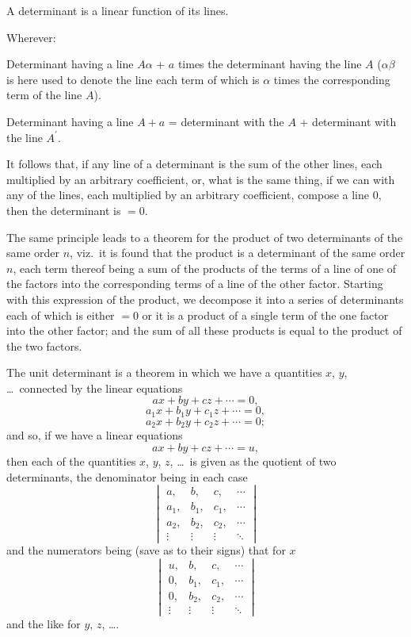 \documentclass[11pt,a4paper]{article}
\theoremstyle{plain}
\theoremstyle{definition}
\begin{document}
A determinant is a linear function of its lines.

Wherever:

Determinant having a line $A$\;$\alpha$ + $a$ times the determinant having the line $A$ ($\alpha\beta$
is here used to denote the line each term of which is $\alpha$ times the corresponding term
of the line $A$).

\clearpage

\noindent
Determinant having a line $A + a$ = determinant with the $A$ + determinant with the
line $A^\prime$.

It follows that, if any line of a determinant is the sum of the other lines, each
multiplied by an arbitrary coefficient, or, what is the same thing, if we can with any
of the lines, each multiplied by an arbitrary coefficient, compose a line $0$, then the
determinant is $= 0$.

The same principle leads to a theorem for the product of two determinants of the
same order $n$, viz.\ it is found that the product is a determinant of the same order $n$,
each term thereof being a sum of the products of the terms of a line of one of the
factors into the corresponding terms of a line of the other factor.  Starting with this
expression of the product, we decompose it into a series of determinants each of which
is either $= 0$ or it is a product of a single term of the one factor into the other
factor; and the sum of all these products is equal to the product of the two factors.

The unit determinant is a theorem in which we have a quantities $x$, $y$, \dots\ connected by the linear equations
\[
ax + by + cz + \cdots = 0,
\]
\[
a_1x + b_1y + c_1z + \cdots = 0,
\]
\[
a_2x + b_2y + c_2z + \cdots = 0;
\]
and so, if we have a linear equations
\[
ax + by + cz + \cdots = u,
\]
then each of the quantities $x$, $y$, $z$, \dots\ is given as the quotient of two determinants,
the denominator being in each case
\[
\begin{vmatrix} a, & b, & c, & \cdots \\ a_1, & b_1, & c_1, & \cdots \\ a_2, & b_2, & c_2, & \cdots \\ \vdots & \vdots & \vdots & \ddots \end{vmatrix}
\]
and the numerators being (save as to their signs) that for $x$
\[
\begin{vmatrix} u, & b, & c, & \cdots \\ 0, & b_1, & c_1, & \cdots \\ 0, & b_2, & c_2, & \cdots \\ \vdots & \vdots & \vdots & \ddots \end{vmatrix}
\]
and the like for $y$, $z$, \dots.
\end{document}
